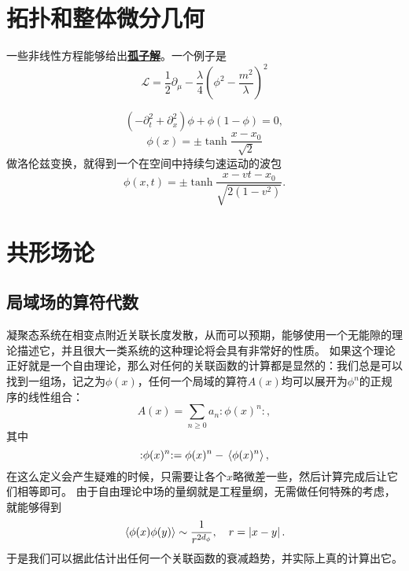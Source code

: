 \documentclass[hyperref, UTF8, a4paper]{ctexart}
\newcommand{\normord}[1]{\vcentcolon\mathrel{#1}\vcentcolon}
\providecommand{\vcentcolon}{\mathrel{\mathop{:}}}
\newcommand{\concept}[1]{\underline{\textbf{#1}}}
\begin{document}
\section{拓扑和整体微分几何}

一些非线性方程能够给出\concept{孤子解}。一个例子是
\begin{equation}
    \mathcal{L} = \frac{1}{2} \partial_\mu - \frac{\lambda}{4} \left(\phi^2 - \frac{m^2}{\lambda} \right)^2
\end{equation}

\begin{equation}
    (-\partial_t^2 + \partial_x^2) \phi + \phi ( 1- \phi) = 0,
\end{equation}
\begin{equation}
    \phi(x) = \pm \tanh \frac{x - x_0}{\sqrt{2}}
\end{equation}
做洛伦兹变换，就得到一个在空间中持续匀速运动的波包
\begin{equation}
    \phi(x, t) = \pm \tanh \frac{x - vt - x_0}{\sqrt{2(1-v^2)}}.
\end{equation}



\section{共形场论}

\subsection{局域场的算符代数}

凝聚态系统在相变点附近关联长度发散，从而可以预期，能够使用一个无能隙的理论描述它，并且很大一类系统的这种理论将会具有非常好的性质。
如果这个理论正好就是一个自由理论，那么对任何的关联函数的计算都是显然的：我们总是可以找到一组场，记之为$\phi(x)$，任何一个局域的算符$A(x)$均可以展开为$\phi^n$的正规序的线性组合：
\begin{equation}
    A(x) = \sum_{n \geq 0} a_n \normord{\phi(x)^n},
\end{equation}
其中
\[
    \normord{\phi(x)^n} = \phi(x)^n - \expval*{\phi(x)^n},
\]
在这么定义会产生疑难的时候，只需要让各个$x$略微差一些，然后计算完成后让它们相等即可。
由于自由理论中场的量纲就是工程量纲，无需做任何特殊的考虑，就能够得到
\begin{equation}
    \expval*{\phi(x) \phi(y)} \sim \frac{1}{r^{2 d_\phi}}, \quad r = \abs*{x - y}.
\end{equation}
于是我们可以据此估计出任何一个关联函数的衰减趋势，并实际上真的计算出它。
\end{document}
